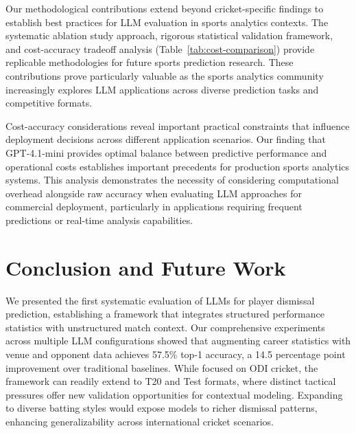 \documentclass[sigconf,anonymous,review]{acmart}
\begin{document}
Our methodological contributions extend beyond cricket-specific findings to establish best practices for LLM evaluation in sports analytics contexts. The systematic ablation study approach, rigorous statistical validation framework, and cost-accuracy tradeoff analysis (Table~\ref{tab:cost-comparison}) provide replicable methodologies for future sports prediction research. These contributions prove particularly valuable as the sports analytics community increasingly explores LLM applications across diverse prediction tasks and competitive formats.

Cost-accuracy considerations reveal important practical constraints that influence deployment decisions across different application scenarios. Our finding that GPT-4.1-mini provides optimal balance between predictive performance and operational costs establishes important precedents for production sports analytics systems. This analysis demonstrates the necessity of considering computational overhead alongside raw accuracy when evaluating LLM approaches for commercial deployment, particularly in applications requiring frequent predictions or real-time analysis capabilities.

\section{Conclusion and Future Work}
We presented the first systematic evaluation of LLMs for player dismissal prediction, establishing a framework that integrates structured performance statistics with unstructured match context.
Our comprehensive experiments across multiple LLM configurations showed that augmenting career statistics with venue and opponent data achieves 57.5\% top-1 accuracy, a 14.5 percentage point improvement over traditional baselines.
While focused on ODI cricket, the framework can readily extend to T20 and Test formats, where distinct tactical pressures offer new validation opportunities for contextual modeling. Expanding to diverse batting styles would expose models to richer dismissal patterns, enhancing generalizability across international cricket scenarios.
\end{document}
